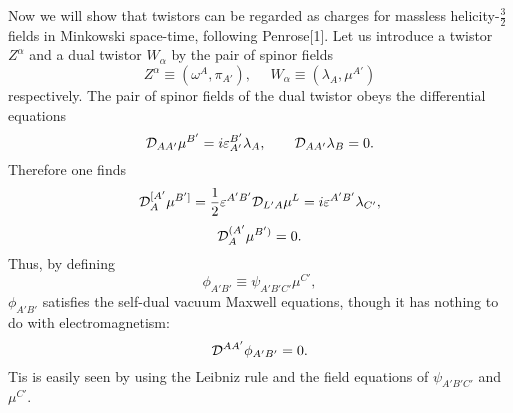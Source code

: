 \documentclass[a4paper,12pt]{article}
\begin{document}
Now we will show that twistors can be regarded as charges for massless helicity-$\frac{3}{2}$ fields in Minkowski space-time, following Penrose[1]. 
Let us introduce a twistor $Z^\alpha$ and a dual twistor $W_\alpha$ by the pair of spinor fields
\begin{equation}
Z^\alpha\equiv (\omega^A,\pi_{A'}),\ \ \ \ \ \ W_\alpha\equiv (\lambda_A,\mu^{A'})
\end{equation}
respectively. The pair of spinor fields of the dual twistor obeys the differential equations
\begin{equation}
{\cal D}_{AA'}\mu^{B'}=i\varepsilon_{A'}^{B'}\lambda_A,\ \ \ \ \ \ {\cal D}_{AA'}\lambda_B=0.
\end{equation}
Therefore one finds
\begin{equation}
{\cal D}^{[A'}_A\mu^{B']}=\frac{1}{2}\varepsilon^{A'B'}{\cal D}_{L'A}\mu^L
=i\varepsilon^{A'B'}\lambda_{C'},
\end{equation}
\begin{equation}
{\cal D}^{(A'}_A\mu^{B')}=0.
\end{equation}
Thus, by defining 
\begin{equation}
\phi_{A'B'}\equiv \psi_{A'B'C'}\mu^{C'},
\end{equation}
$\phi_{A'B'}$ satisfies the self-dual vacuum Maxwell equations, though it has nothing to do with electromagnetism:
\begin{equation}
{\cal D}^{AA'}\phi_{A'B'}=0.
\end{equation}
Tis is easily seen by using the Leibniz rule and the field equations of $\psi_{A'B'C'}$ and $\mu^{C'}$.
\end{document}

